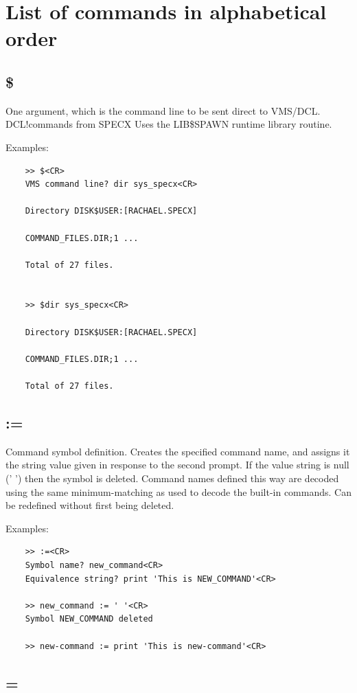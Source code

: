 \documentclass[11pt,twoside]{report}
\begin{document}
\section{List of commands in alphabetical order}
\subsection{\$} 

One argument, which is the command line to be sent direct to VMS/DCL. \index
{DCL!commands from SPECX} Uses the LIB\$SPAWN  runtime
library routine. 

Examples:
\begin{verbatim}
    >> $<CR>
    VMS command line? dir sys_specx<CR>

    Directory DISK$USER:[RACHAEL.SPECX]

    COMMAND_FILES.DIR;1 ...

    Total of 27 files.


    >> $dir sys_specx<CR>

    Directory DISK$USER:[RACHAEL.SPECX]

    COMMAND_FILES.DIR;1 ...

    Total of 27 files.
\end{verbatim}

\subsection{:=} \index{:=} 

Command symbol definition. Creates the specified command name, and assigns
it the string value given in response to the second prompt. If the value 
string is null (' ') then the symbol is deleted. Command names defined 
this way are decoded using the same minimum-matching as used to decode the
built-in commands. Can be redefined without first being deleted.

Examples:
\begin{verbatim}
    >> :=<CR>
    Symbol name? new_command<CR>
    Equivalence string? print 'This is NEW_COMMAND'<CR>

    >> new_command := ' '<CR>
    Symbol NEW_COMMAND deleted

    >> new-command := print 'This is new-command'<CR>
\end{verbatim}

\subsection{=} \index{=} 
\end{document}

